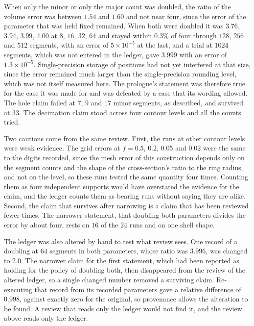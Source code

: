 When only the minor or only the major count was doubled, the ratio of the volume error was between $1.54$ and $1.60$ and not near four, since the error of the parameter that was held fixed remained. When both were doubled it was $3.76$, $3.94$, $3.99$, $4.00$ at $8$, $16$, $32$, $64$ and stayed within $0.3\%$ of four through $128$, $256$ and $512$ segments, with an error of $5\times 10^{-5}$ at the last, and a trial at $1024$ segments, which was not entered in the ledger, gave $3.999$ with an error of $1.3\times 10^{-5}$. Single-precision storage of positions had not yet interfered at that size, since the error remained much larger than the single-precision rounding level, which was not itself measured here. The prologue's statement was therefore true for the case it was made for and was defeated by a case that its wording allowed. The hole claim failed at $7$, $9$ and $17$ minor segments, as described, and survived at $33$. The decimation claim stood across four contour levels and all the counts tried.

Two cautions come from the same review. First, the runs at other contour levels were weak evidence. The grid errors at $f=0.5$, $0.2$, $0.05$ and $0.02$ were the same to the digits recorded, since the mesh error of this construction depends only on the segment counts and the shape of the cross-section's ratio to the ring radius, and not on the level, so these runs tested the same quantity four times. Counting them as four independent supports would have overstated the evidence for the claim, and the ledger counts them as bearing runs without saying they are alike. Second, the claim that survives after narrowing is a claim that has been reviewed fewer times. The narrower statement, that doubling both parameters divides the error by about four, rests on $16$ of the $24$ runs and on one shell shape.

The ledger was also altered by hand to test what review sees. One record of a doubling at $64$ segments in both parameters, whose ratio was $3.996$, was changed to $2.0$. The narrower claim for the first statement, which had been reported as holding for the policy of doubling both, then disappeared from the review of the altered ledger, so a single changed number removed a surviving claim. Re-executing that record from its recorded parameters gave a relative difference of $0.998$, against exactly zero for the original, so provenance allows the alteration to be found. A review that reads only the ledger would not find it, and the review above reads only the ledger.

